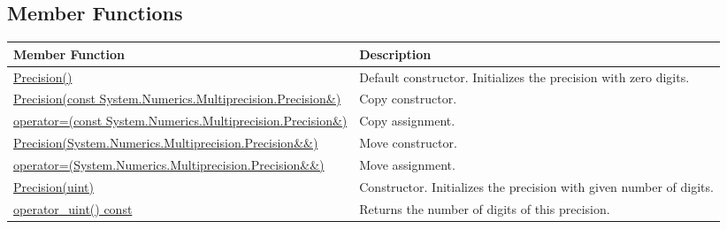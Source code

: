 \documentclass[a4paper,oneside,11.000000pt]{book}
\begin{document}
\subsection{Member Functions}
\begin{flushleft}
\begin{supertabular}[l]{!{\raggedright}p{7.575cm}!{\raggedright}p{7.575cm}}
\textbf{Member Function}
& \textbf{Description}
\\
\hline
\hyperlink{System.Numerics.Multiprecision.Precision.constructor.P.System.Numerics.Multiprecision.Precision}{Precision()}
& Default constructor. Initializes the precision with zero digits.

\\
\hyperlink{System.Numerics.Multiprecision.Precision.constructor.P.System.Numerics.Multiprecision.Precision.C.R.System.Numerics.Multiprecision.Precision}{Precision(const System.\-Numerics.\-Multiprecision.\-Precision\&\-)}
& Copy constructor.

\\
\hyperlink{System.Numerics.Multiprecision.Precision.operator.assign.P.System.Numerics.Multiprecision.Precision.C.R.System.Numerics.Multiprecision.Precision}{operator=(const System.\-Numerics.\-Multiprecision.\-Precision\&\-)}
& Copy assignment.

\\
\hyperlink{System.Numerics.Multiprecision.Precision.constructor.P.System.Numerics.Multiprecision.Precision.RR.System.Numerics.Multiprecision.Precision}{Precision(System.\-Numerics.\-Multiprecision.\-Precision\&\-\&\-)}
& Move constructor.

\\
\hyperlink{System.Numerics.Multiprecision.Precision.operator.assign.P.System.Numerics.Multiprecision.Precision.RR.System.Numerics.Multiprecision.Precision}{operator=(System.\-Numerics.\-Multiprecision.\-Precision\&\-\&\-)}
& Move assignment.

\\
\hyperlink{System.Numerics.Multiprecision.Precision.constructor.P.System.Numerics.Multiprecision.Precision.uint}{Precision(uint)}
& Constructor. Initializes the precision with given number of digits.

\\
\hyperlink{System.Numerics.Multiprecision.Precision.operator\_uint.C.P.System.Numerics.Multiprecision.Precision}{operator\_\-uint() const}
& Returns the number of digits of this precision.

\\
\end{supertabular}

\end{flushleft}
\clearpage
\end{document}
